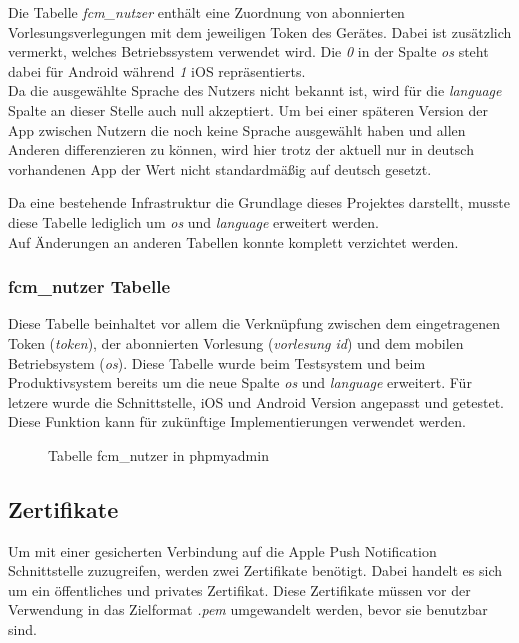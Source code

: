 Die Tabelle \textit{fcm\_nutzer} enthält eine Zuordnung von abonnierten Vorlesungsverlegungen mit dem jeweiligen Token des Gerätes. Dabei ist zusätzlich vermerkt, welches Betriebssystem verwendet wird. Die \textit{0} in der Spalte \textit{os} steht dabei für Android während \textit{1} iOS repräsentierts. \\
Da die ausgewählte Sprache des Nutzers nicht bekannt ist, wird für die \textit{language} Spalte an dieser Stelle auch null akzeptiert. Um bei einer späteren Version der App zwischen Nutzern die noch keine Sprache ausgewählt haben und allen Anderen differenzieren zu können, wird hier trotz der aktuell nur in deutsch vorhandenen App der Wert nicht standardmäßig auf deutsch gesetzt.

Da eine bestehende Infrastruktur die Grundlage dieses Projektes darstellt, musste diese Tabelle lediglich um \textit{os} und \textit{language} erweitert werden.\\
Auf Änderungen an anderen Tabellen konnte komplett verzichtet werden.

\newpage

\subsubsection{fcm\_nutzer Tabelle}
Diese Tabelle beinhaltet vor allem die Verknüpfung zwischen dem eingetragenen Token (\textit{token}), der abonnierten Vorlesung (\textit{vorlesung id}) und dem mobilen Betriebsystem (\textit{os}). Diese Tabelle wurde beim Testsystem und beim Produktivsystem bereits um die neue Spalte \textit{os} und \textit{language} erweitert. Für letzere wurde die Schnittstelle, iOS und Android Version angepasst und getestet. Diese Funktion kann für zukünftige Implementierungen verwendet werden.
\begin{figure}[H]
	\centering
	\caption{Tabelle fcm\_nutzer in phpmyadmin}
	\label{datenbank_nutzer}
\end{figure}

\textcolor{black}{

}

\newpage

\subsection{Zertifikate}
Um mit einer gesicherten Verbindung auf die Apple Push Notification Schnittstelle zuzugreifen, werden zwei Zertifikate benötigt. Dabei handelt es sich um ein öffentliches und privates Zertifikat. Diese Zertifikate müssen vor der Verwendung in das Zielformat \textit{.pem} umgewandelt werden, bevor sie benutzbar sind.

